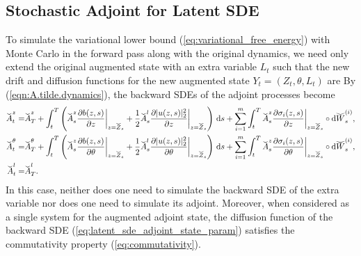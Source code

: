 \documentclass[twoside]{article}
\begin{document}
 \subsection{Stochastic Adjoint for Latent SDE}\label{app:latent_sde_adjoint}
To simulate the variational lower bound (\ref{eq:variational_free_energy}) with Monte Carlo in the forward pass along with the original dynamics, we need only extend the original augmented state with an extra variable $L_t$ such that the new drift and diffusion functions for the new augmented state $Y_t = (Z_t, \theta, L_t)$ are
By (\ref{eqn:A.tilde.dynamics}), the backward SDEs of the adjoint processes become
\begin{equation}
\begin{aligned}
\label{eq:latent_sde_adjoint_state_param}
    \widecheck{A}^z_t =&
        \widecheck{A}^z_T +
        \int_t^T \bracks{
            \widecheck{A}_s^z \frac{\partial b(z, s)}{\partial z}\bigg|_{z=\widecheck{Z}_s} + 
            \frac{1}{2} \widecheck{A}_s^l \frac{\partial |{ u(z, s) }|_2^2 }{\partial z}\bigg|_{z=\widecheck{Z}_s}  } \ds +
        \sum_{i=1}^m \int_t^T
            \widecheck{A}_s^z \frac{\partial \sigma_i(z, s)}{\partial z}\bigg|_{z=\widecheck{Z}_s} \circ \dee \widecheck{W}_s^{(i)}, \\
    \widecheck{A}^\theta_t =& 
        \widecheck{A}^\theta_T +
        \int_t^T \bracks{
            \widecheck{A}_s^z \frac{\partial b(z, s)}{\partial \theta}\bigg|_{z=\widecheck{Z}_s} + 
            \frac{1}{2} \widecheck{A}_s^l \frac{\partial |{ u(z, s) }|_2^2 }{\partial \theta}\bigg|_{z=\widecheck{Z}_s} } \ds +
        \sum_{i=1}^m \int_t^T
            \widecheck{A}_s^z \frac{\partial \sigma_i(z, s)}{\partial \theta}\bigg|_{z=\widecheck{Z}_s} \circ \dee \widecheck{W}_s^{(i)}, \\
    \widecheck{A}^l_t =& \widecheck{A}^l_T.
\end{aligned}
\end{equation}
In this case, neither does one need to simulate the backward SDE of the extra variable nor does one need to simulate its adjoint. Moreover, when considered as a single system for the augmented adjoint state, the diffusion function of the backward SDE (\ref{eq:latent_sde_adjoint_state_param}) satisfies the commutativity property (\ref{eq:commutativity}). 
\end{document}
